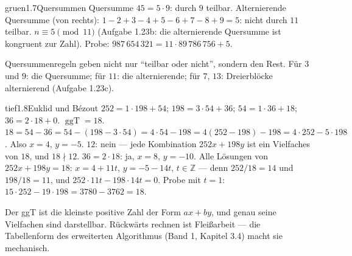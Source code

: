 \begin{loesungkarte}{gruen}{1.7}{Quersummen}
Quersumme $45 = 5\cdot9$: durch $9$ teilbar. Alternierende Quersumme (von rechts): $1 - 2 + 3 - 4 + 5 - 6 + 7 - 8 + 9 = 5$: nicht durch $11$ teilbar.
$n\equiv5\pmod{11}$ (Aufgabe 1.23b: die alternierende Quersumme ist kongruent zur Zahl). Probe: $987\,654\,321 = 11\cdot89\,786\,756 + 5$. \checkmark
\begin{mitnehmen}\kastentext
Quersummenregeln geben nicht nur \enquote{teilbar oder nicht}, sondern den Rest. Für $3$ und $9$: die Quersumme; für $11$: die alternierende; für $7$, $13$: Dreierblöcke alternierend (Aufgabe 1.23c).
\end{mitnehmen}
\end{loesungkarte}

\begin{loesungkarte}{tief}{1.8}{Euklid und Bézout}
$252 = 1\cdot198 + 54$; $198 = 3\cdot54 + 36$; $54 = 1\cdot36 + 18$; $36 = 2\cdot18 + 0$. $\operatorname{ggT} = 18$.
$18 = 54 - 36 = 54 - (198 - 3\cdot54) = 4\cdot54 - 198 = 4(252 - 198) - 198 = 4\cdot252 - 5\cdot198$. Also $x = 4$, $y = -5$.
$12$: nein --- jede Kombination $252x + 198y$ ist ein Vielfaches von $18$, und $18\nmid12$. $36 = 2\cdot18$: ja, $x = 8$, $y = -10$.
Alle Lösungen von $252x + 198y = 18$: $x = 4 + 11t$, $y = -5 - 14t$, $t\in\mathbb Z$ --- denn $252/18 = 14$ und $198/18 = 11$, und $252\cdot11t - 198\cdot14t = 0$. Probe mit $t = 1$: $15\cdot252 - 19\cdot198 = 3780 - 3762 = 18$. \checkmark
\begin{mitnehmen}\kastentext
Der ggT ist die kleinste positive Zahl der Form $ax + by$, und genau seine Vielfachen sind darstellbar. Rückwärts rechnen ist Fleißarbeit --- die Tabellenform des erweiterten Algorithmus (Band 1, Kapitel 3.4) macht sie mechanisch.
\end{mitnehmen}
\end{loesungkarte}

